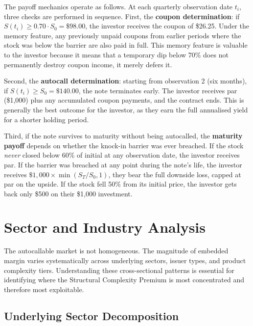 \documentclass[12pt,a4paper]{article}
\begin{document}
The payoff mechanics operate as follows. At each quarterly observation date $t_i$, three checks are performed in sequence. First, the \textbf{coupon determination}: if $S(t_i) \geq 0.70 \cdot S_0 = \$98.00$, the investor receives the coupon of \$26.25. Under the memory feature, any previously unpaid coupons from earlier periods where the stock was below the barrier are also paid in full. This memory feature is valuable to the investor because it means that a temporary dip below 70\% does not permanently destroy coupon income, it merely defers it.

Second, the \textbf{autocall determination}: starting from observation 2 (six months), if $S(t_i) \geq S_0 = \$140.00$, the note terminates early. The investor receives par (\$1,000) plus any accumulated coupon payments, and the contract ends. This is generally the best outcome for the investor, as they earn the full annualised yield for a shorter holding period.

Third, if the note survives to maturity without being autocalled, the \textbf{maturity payoff} depends on whether the knock-in barrier was ever breached. If the stock \textit{never} closed below 60\% of initial at any observation date, the investor receives par. If the barrier was breached at any point during the note's life, the investor receives $\$1{,}000 \times \min(S_T/S_0, 1)$, they bear the full downside loss, capped at par on the upside. If the stock fell 50\% from its initial price, the investor gets back only \$500 on their \$1,000 investment.

\newpage
\section{Sector and Industry Analysis}
\label{sec:sectors}

The autocallable market is not homogeneous. The magnitude of embedded margin varies systematically across underlying sectors, issuer types, and product complexity tiers. Understanding these cross-sectional patterns is essential for identifying where the Structural Complexity Premium is most concentrated and therefore most exploitable.

\subsection{Underlying Sector Decomposition}
\end{document}
